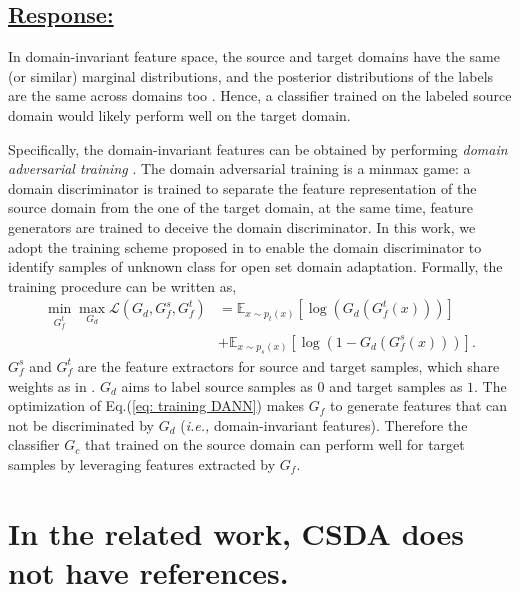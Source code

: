 \subsection*{\underline{\textbf{Response:}}}

In domain-invariant feature space, the source and target domains have the same (or similar) marginal distributions, and the posterior distributions of the labels are the same across domains too \cite{DeepDomainConfusion}.
Hence, a classifier trained on the labeled source domain would likely perform well on the target domain.

Specifically, the domain-invariant features can be obtained by performing \textit{domain adversarial training} \cite{DomainAdversrialNetwork,ADDA,OpensetDA-bp}.
The domain adversarial training is a minmax game: a domain discriminator is trained to separate the feature representation of the source domain from the one of the target domain, at the same time, feature generators are trained to deceive the domain discriminator.
In this work, we adopt the training scheme proposed in \cite{OpensetDA-bp} to enable the domain discriminator to identify samples of unknown class for open set domain adaptation. 
Formally, the training procedure can be written as,
\begin{equation}
    \label{eq: training DANN}
    \begin{split}
        \min_{G_f^t} \max_{G_d} \mathscr{L}(G_d,G^{s}_{f},G_f^t) &=\mathbb{E}_{x\sim p_t(x)} \left[ \log \left(G_d\left(G_f^t\left(x\right)\right)\right) \right]\\
        &+\mathbb{E}_{x\sim p_s(x)}\left[ \log \left(1-G_d\left(G_f^s\left(x\right)\right)\right) \right].
    \end{split}
\end{equation}
$G_f^s$ and $G_f^t$ are the feature extractors for source and target samples, which share weights as in \cite{OpensetDA-bp}.
$G_d$ aims to label source samples as $0$ and target samples as $1$.
The optimization of Eq.(\ref{eq: training DANN}) makes $G_f$ to generate features that can not be discriminated by $G_d$ (\textit{i.e.,} domain-invariant features).
Therefore the classifier $G_c$ that trained on the source domain can perform well for target samples by leveraging features extracted by $G_f$.

\section{In the related work, CSDA does not have references.}
